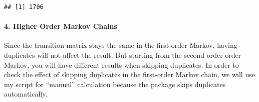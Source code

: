 \documentclass[
]{book}
\begin{document}
\begin{verbatim}
## [1] 1706
\end{verbatim}

\hypertarget{higher-order-markov-chains}{%
\paragraph{4. Higher Order Markov Chains}\label{higher-order-markov-chains}}

Since the transition matrix stays the same in the first order Markov, having duplicates will not affect the result. But starting from the second order order Markov, you will have different results when skipping duplicates. In order to check the effect of skipping duplicates in the first-order Markov chain, we will use my script for ``manual'' calculation because the package skips duplicates automatically.
\end{document}
